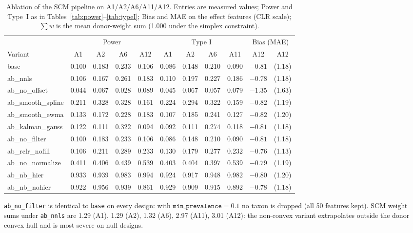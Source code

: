 \documentclass[11pt]{article}
\begin{document}
\begin{table}[t]
\centering
\caption{Ablation of the SCM pipeline on A1/A2/A6/A11/A12. Entries are measured values; Power and
Type~I as in Tables~\ref{tab:power}--\ref{tab:typeI}; Bias and MAE on the effect features (CLR
scale); $\sum w$ is the mean donor-weight sum (1.000 under the simplex constraint).}
\label{tab:ablation}
\small
\begin{threeparttable}
\begin{tabular}{lcccccccccc}
\toprule
 & \multicolumn{4}{c}{Power} & \multicolumn{4}{c}{Type I} & \multicolumn{2}{c}{Bias (MAE)} \\
\cmidrule(lr){2-5}\cmidrule(lr){6-9}\cmidrule(lr){10-11}
Variant & A1 & A2 & A6 & A12 & A1 & A2 & A6 & A11 & A12 & A12 \\
\midrule
base            & 0.100 & 0.183 & 0.233 & 0.106 & 0.086 & 0.148 & 0.210 & 0.090 & $-0.81$ & (1.18) \\
ab\_nnls        & 0.106 & 0.167 & 0.261 & 0.183 & 0.110 & 0.197 & 0.227 & 0.186 & $-0.78$ & (1.18) \\
ab\_no\_offset   & 0.044 & 0.067 & 0.028 & 0.089 & 0.045 & 0.067 & 0.057 & 0.079 & $-1.35$ & (1.63) \\
ab\_smooth\_spline & 0.211 & 0.328 & 0.328 & 0.161 & 0.224 & 0.294 & 0.322 & 0.159 & $-0.82$ & (1.19) \\
ab\_smooth\_ewma & 0.133 & 0.172 & 0.228 & 0.183 & 0.107 & 0.185 & 0.241 & 0.127 & $-0.82$ & (1.20) \\
ab\_kalman\_gauss & 0.122 & 0.111 & 0.322 & 0.094 & 0.092 & 0.111 & 0.274 & 0.118 & $-0.81$ & (1.18) \\
ab\_no\_filter   & 0.100 & 0.183 & 0.233 & 0.106 & 0.086 & 0.148 & 0.210 & 0.090 & $-0.81$ & (1.18) \\
ab\_rclr\_nofill & 0.106 & 0.211 & 0.289 & 0.233 & 0.130 & 0.179 & 0.277 & 0.232 & $-0.76$ & (1.13) \\
ab\_no\_normalize & 0.411 & 0.406 & 0.439 & 0.539 & 0.403 & 0.404 & 0.397 & 0.539 & $-0.79$ & (1.19) \\
ab\_nb\_hier     & 0.933 & 0.939 & 0.983 & 0.994 & 0.924 & 0.917 & 0.948 & 0.982 & $-0.80$ & (1.20) \\
ab\_nb\_nohier   & 0.922 & 0.956 & 0.939 & 0.861 & 0.929 & 0.909 & 0.915 & 0.892 & $-0.78$ & (1.18) \\
\bottomrule
\end{tabular}
\begin{tablenotes}\small
\item \texttt{ab\_no\_filter} is identical to \texttt{base} on every design: with
$\texttt{min\_prevalence}=0.1$ no taxon is dropped (all 50 features kept). SCM weight sums under
\texttt{ab\_nnls} are 1.29 (A1), 1.29 (A2), 1.32 (A6), 2.97 (A11), 3.01 (A12): the non-convex
variant extrapolates outside the donor convex hull and is most severe on null designs.
\end{tablenotes}
\end{threeparttable}
\end{table}
\end{document}
